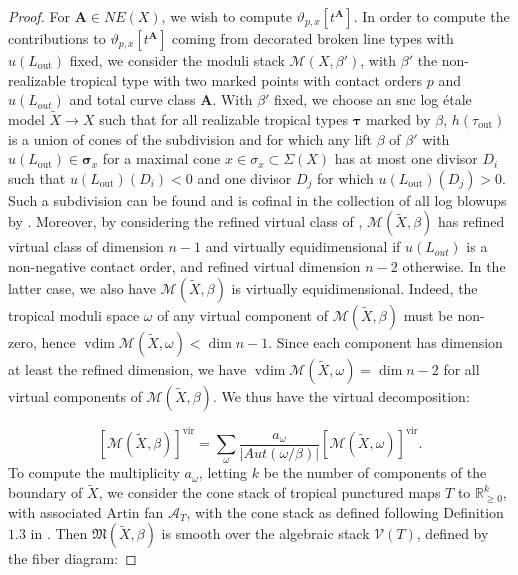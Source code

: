 \documentclass[12pt, oneside]{amsart}   	%
\newcommand{\vir}{\operatorname{vir}}
\newcommand{\vdim}{\operatorname{vdim}}
\newcommand{\out}{\operatorname{out}}
\numberwithin{equation}{section}
\numberwithin{thm}{section}
\numberwithin{figure}{section}
\begin{document}
 
\begin{proof}
For $\textbf{A} \in NE(X)$, we wish to compute $\vartheta_{p,x}[t^{\textbf{A}}]$. In order to compute the contributions to $\vartheta_{p,x}[t^{\textbf{A}}]$ coming from decorated broken line types with $u(L_{\out})$ fixed, we consider the moduli stack $\mathscr{M}(X,\beta')$, with $\beta'$ the non-realizable tropical type with two marked points with contact orders $p$ and $u(L_{out})$ and total curve class $\textbf{A}$. With $\beta'$ fixed, we choose an snc log \'etale model $\widetilde{X} \rightarrow X$ such that for all realizable tropical types $\pmb\tau$ marked by $\beta$, $h(\tau_{\out})$ is a union of cones of the subdivision and for which any lift $\beta$ of $\beta'$ with $u(L_{\out}) \in \pmb\sigma_x$ for a maximal cone $x \in \sigma_x \subset \Sigma(X)$ has at most one divisor $D_i$ such that $u(L_{\out})(D_i) < 0$ and one divisor $D_j$ for which $u(L_{\out})(D_j) > 0$. Such a subdivision can be found and is cofinal in the collection of all log blowups by \cite[Proposition $6.1$]{BNR2}. Moreover, by considering the refined virtual class of \cite{BNR2}, $\mathscr{M}(\widetilde{X},\beta)$ has refined virtual class of dimension $n-1$ and virtually equidimensional if $u(L_{out})$ is a non-negative contact order, and refined virtual dimension $n-2$ otherwise. In the latter case, we also have $\mathscr{M}(\widetilde{X},\beta)$ is virtually equidimensional. Indeed, the tropical moduli space $\omega$ of any virtual component of $\mathscr{M}(\widetilde{X},\beta)$ must be non-zero, hence $\vdim \mathscr{M}(\widetilde{X},\omega) < \dim n-1$. Since each component has dimension at least the refined dimension, we have $\vdim \mathscr{M}(\widetilde{X},\omega) = \dim n-2$ for all virtual components of $\mathscr{M}(\widetilde{X},\beta)$. We thus have the virtual decomposition:
 
 \begin{equation}\label{vdcmp}
 [\mathscr{M}(\widetilde{X},\beta)]^{\vir} = \sum_{\omega} \frac{a_{\omega}}{|Aut(\omega/\beta)|}[\mathscr{M}(\widetilde{X},\omega)]^{\vir}.
 \end{equation}
 To compute the multiplicity $a_{\omega}$, letting $k$ be the number of components of the boundary of $\widetilde{X}$, we consider the cone stack of tropical punctured maps $T$ to $\mathbb{R}_{\ge 0}^k$, with associated Artin fan $\mathcal{A}_T$, with the cone stack as defined following Definition $1.3$ in \cite{BNR2}. Then $\mathfrak{M}(\widetilde{X},\beta)$ is smooth over the algebraic stack $\mathcal{V}(T)$, defined by the fiber diagram:
 

\end{proof}
\end{document}
